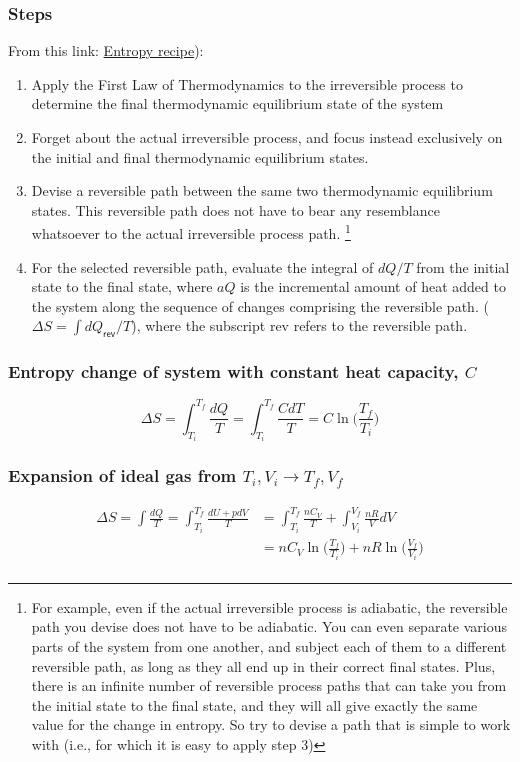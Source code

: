 \subsubsection{Steps} {From this link: \href{https://www.physicsforums.com/insights/grandpa-chets-entropy-recipe/}{Entropy recipe}):
\begin{enumerate}
    \item Apply the First Law of Thermodynamics to the irreversible process to determine the final thermodynamic equilibrium state of the system
    \item Forget about the actual irreversible process, and focus instead exclusively on the initial and final thermodynamic equilibrium states.
    \item Devise a reversible path between the same two thermodynamic equilibrium states. This reversible path does not have to bear any resemblance whatsoever to the actual irreversible process path. \footnote{For example, even if the actual irreversible process is adiabatic, the reversible path you devise does not have to be adiabatic.  You can even separate various parts of the system from one another, and subject each of them to a different reversible path, as long as they all end up in their correct final states. Plus, there is an infinite number of reversible process paths that can take you from the initial state to the final state, and they will all give exactly the same value for the change in entropy.  So try to devise a path that is simple to work with (i.e., for which it is easy to apply step 3)}
    \item For the selected reversible path, evaluate the integral of $dQ/T$ from the initial state to the final state, where $aQ$ is the incremental amount of heat added to the system along the sequence of changes comprising the reversible path. ($\Delta S = \int dQ_\textsf{rev}/T$), where the subscript rev refers to the reversible path.
\end{enumerate}

\subsubsection{Entropy change of system with constant heat capacity, $C$}
\begin{equation}
    \Delta S = \int_{T_i}^{T_f} \frac{dQ}{T} =\int_{T_i}^{T_f} \frac{C dT}{T}= C\ln\bigg(\frac{T_f}{T_i}\bigg)
\end{equation}

\subsubsection{Expansion of ideal gas from $T_i, V_i \to T_f, V_f$}
\begin{equation}
    \begin{aligned}
        \Delta S = \int \frac{dQ}{T} =\int_{T_i}^{T_f} \frac{dU+pdV}{T} &= \int_{T_i}^{T_f} \frac{nC_V}{T} + \int_{V_i}^{V_f} \frac{nR}{V}dV \\
        &= nC_V \ln \bigg(\frac{T_f}{T_i}\bigg) + nR\ln \bigg(\frac{V_f}{V_i}\bigg)\\
    \end{aligned}
\end{equation}

}
